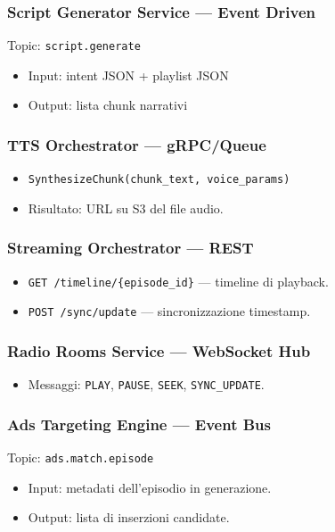 \documentclass[11pt,a4paper]{article}
\begin{document}
\subsubsection*{Script Generator Service — Event Driven}
Topic: \verb|script.generate|
\begin{itemize}
    \item Input: intent JSON + playlist JSON
    \item Output: lista chunk narrativi
\end{itemize}

\subsubsection*{TTS Orchestrator — gRPC/Queue}
\begin{itemize}
    \item \verb|SynthesizeChunk(chunk_text, voice_params)|
    \item Risultato: URL su S3 del file audio.
\end{itemize}

\subsubsection*{Streaming Orchestrator — REST}
\begin{itemize}
    \item \verb|GET /timeline/{episode_id}| — timeline di playback.
    \item \verb|POST /sync/update| — sincronizzazione timestamp.
\end{itemize}

\subsubsection*{Radio Rooms Service — WebSocket Hub}
\begin{itemize}
    \item Messaggi: \verb|PLAY|, \verb|PAUSE|, \verb|SEEK|, \verb|SYNC_UPDATE|.
\end{itemize}

\subsubsection*{Ads Targeting Engine — Event Bus}
Topic: \verb|ads.match.episode|
\begin{itemize}
    \item Input: metadati dell’episodio in generazione.
    \item Output: lista di inserzioni candidate.
\end{itemize}
\end{document}
